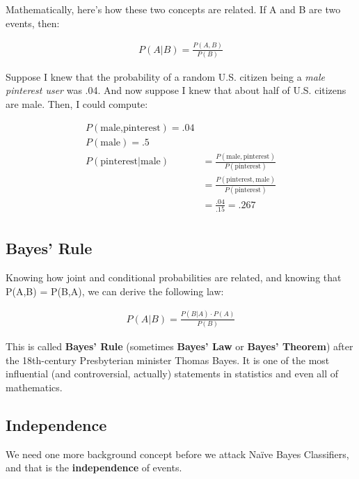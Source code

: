Mathematically, here's how these two concepts are related. If A and B are two
events, then:

\vspace{-.2in}
\begin{align*}
P(A|B) = \frac{P(A,B)}{P(B)}
\end{align*}

Suppose I knew that the probability of a random U.S. citizen being a
\textit{male pinterest user} was .04. And now suppose I knew that about half
of U.S. citizens are male. Then, I could compute:

\vspace{-.2in}
\begin{align*}
P(\textrm{male,pinterest}) = .04 \\
P(\textrm{male}) = .5 \\
P(\textrm{pinterest} | \textrm{male}) &= \frac{P(\textrm{male},
\textrm{pinterest})}{P(\textrm{pinterest})} \\
                    &= \frac{P(\textrm{pinterest},
\textrm{male})}{P(\textrm{pinterest})} \\
                    &= \frac{.04}{.15} = .267 \\
\end{align*}

\subsection{Bayes' Rule}

Knowing how joint and conditional probabilities are related, and knowing that
P(A,B) = P(B,A), we can derive the following law:

\vspace{-.2in}
\begin{align*}
P(A|B) = \frac{P(B|A) \cdot P(A)}{P(B)}
\end{align*}

This is called \textbf{Bayes' Rule} (sometimes \textbf{Bayes' Law} or
\textbf{Bayes' Theorem}) after the 18th-century Presbyterian minister Thomas
Bayes. It is one of the most influential (and controversial, actually)
statements in statistics and even all of mathematics.

\subsection{Independence}

We need one more background concept before we attack Na\"{i}ve Bayes Classifiers,
and that is the \textbf{independence} of events.

